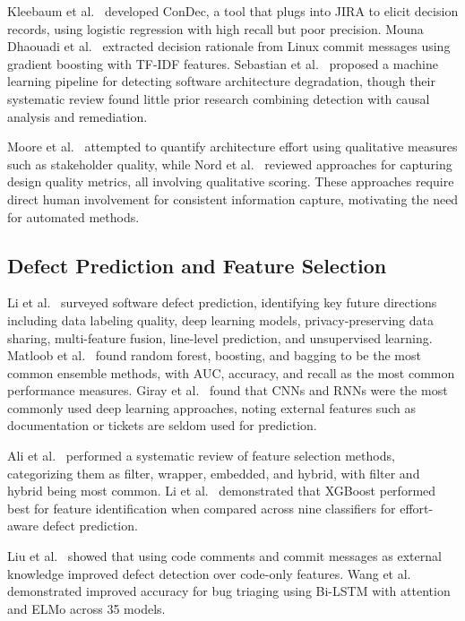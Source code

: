 \documentclass[preprint,12pt]{elsarticle}
\begin{document}
Kleebaum et al.~\cite{kleebaum2021} developed ConDec, a tool that plugs into JIRA to elicit decision records, using logistic regression with high recall but poor precision. Mouna Dhaouadi et al.~\cite{dhaouadi2023} extracted decision rationale from Linux commit messages using gradient boosting with TF-IDF features. Sebastian et al.~\cite{sebastian2020} proposed a machine learning pipeline for detecting software architecture degradation, though their systematic review found little prior research combining detection with causal analysis and remediation.

Moore et al.~\cite{moore2003} attempted to quantify architecture effort using qualitative measures such as stakeholder quality, while Nord et al.~\cite{nord2014} reviewed approaches for capturing design quality metrics, all involving qualitative scoring. These approaches require direct human involvement for consistent information capture, motivating the need for automated methods.

\subsection{Defect Prediction and Feature Selection}

Li et al.~\cite{li2024} surveyed software defect prediction, identifying key future directions including data labeling quality, deep learning models, privacy-preserving data sharing, multi-feature fusion, line-level prediction, and unsupervised learning. Matloob et al.~\cite{matloob2021} found random forest, boosting, and bagging to be the most common ensemble methods, with AUC, accuracy, and recall as the most common performance measures. Giray et al.~\cite{giray2023} found that CNNs and RNNs were the most commonly used deep learning approaches, noting external features such as documentation or tickets are seldom used for prediction.

Ali et al.~\cite{ali2023} performed a systematic review of feature selection methods, categorizing them as filter, wrapper, embedded, and hybrid, with filter and hybrid being most common. Li et al.~\cite{li2023} demonstrated that XGBoost performed best for feature identification when compared across nine classifiers for effort-aware defect prediction.

Liu et al.~\cite{liu2023} showed that using code comments and commit messages as external knowledge improved defect detection over code-only features. Wang et al.~\cite{wang2024} demonstrated improved accuracy for bug triaging using Bi-LSTM with attention and ELMo across 35 models.
\end{document}
